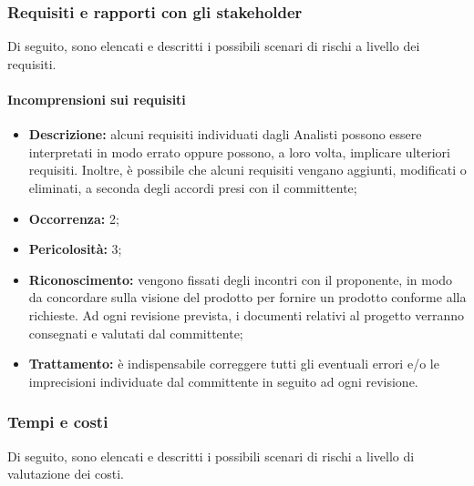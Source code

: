 \subsubsection{Requisiti e rapporti con gli stakeholder}

Di seguito, sono elencati e descritti i possibili scenari di rischi a livello dei requisiti.

\paragraph{Incomprensioni sui requisiti}
\begin{itemize}
	\item \textbf{Descrizione:} alcuni requisiti individuati dagli Analisti possono essere interpretati in modo errato oppure possono, a loro volta, implicare ulteriori requisiti. Inoltre, è possibile che alcuni requisiti vengano aggiunti, modificati o eliminati, a seconda degli accordi presi con il committente;
	\item \textbf{Occorrenza:} 2;
	\item \textbf{Pericolosità:} 3;
	\item \textbf{Riconoscimento:} vengono fissati degli incontri con il proponente, in modo da concordare sulla visione del prodotto per fornire un prodotto conforme alla richieste. Ad ogni revisione prevista, i documenti relativi al progetto verranno consegnati e valutati dal committente;
	\item \textbf{Trattamento:} è indispensabile correggere tutti gli eventuali errori e/o le imprecisioni individuate dal committente in seguito ad ogni revisione.
\end{itemize}

\subsubsection{Tempi e costi}

Di seguito, sono elencati e descritti i possibili scenari di rischi a livello di valutazione dei costi.

